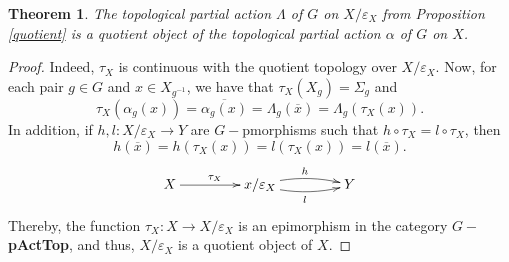 \documentclass[sn-mathphys-num]{sn-jnl}%
\theoremstyle{thmstyleone}%
\newtheorem{theorem}{Theorem}%
\theoremstyle{thmstyletwo}%
\theoremstyle{thmstylethree}%
\begin{document}
\begin{theorem}
The topological partial action $\Lambda$ of $G$ on $X/\varepsilon_X$ from Proposition \ref{quotient} is a quotient object of the topological partial action $\alpha$ of $G$ on $X$.
\end{theorem}
\begin{proof}
Indeed,  $\tau_X$ is continuous with the quotient topology  over $X / \varepsilon_X$. Now, for each pair $ g \in G $ and $ x \in X_{g^{-1}}$, we have that $\tau_X (X_g)=\Sigma_g $  and
$$ \tau_X (\alpha_g( x)) = \overline {\alpha_g( x)} = \Lambda_g(\overline {x}) = \Lambda_g(\tau_X (x)).$$
In addition, if $h,l: X / \varepsilon_X \to Y$ are $G-$pmorphisms such that
$h \circ \tau_X = l \circ \tau_X$, then 
$$h(\overline{x})=h(\tau_X(x))=l(\tau_X(x))=l(\overline{x}).$$
$$
\xymatrix@=1.5cm{
X \ar[r]^{\tau_X} & x/\varepsilon_X \ar@/_0.4pc/[r]_{l} \ar@/_{-0.4pc}/[r]^{h} &  Y
}
$$
Thereby, %
the function $\tau_X:X \to X/\varepsilon_X$ is an epimorphism in the category $G-$\textbf{pActTop}, and thus, $X/\varepsilon_X$ is a quotient object of $X$.
\end{proof}
\end{document}
